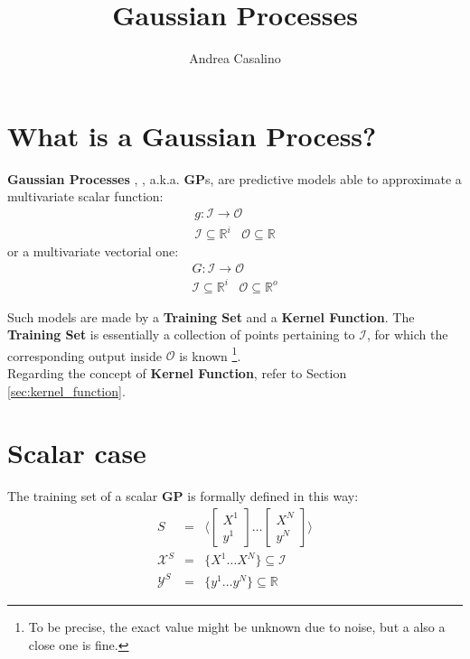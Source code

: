 \documentclass{article}
\author{Andrea Casalino}
\title{Gaussian Processes}
\begin{document}
\maketitle

\newpage
\section{What is a Gaussian Process?}

\textbf{Gaussian Processes} \cite{GP_general_01}, \cite{GP_general_02}, a.k.a. \textbf{GP}s, are predictive models able to approximate a multivariate scalar function:
\begin{eqnarray}
g : \mathcal{I} \rightarrow \mathcal{O} \\
\mathcal{I} \subseteq \mathbb{R}^i \,\,\,\,\, \mathcal{O} \subseteq \mathbb{R}
\end{eqnarray}
or a  multivariate vectorial one:
\begin{eqnarray}
G : \mathcal{I} \rightarrow \mathcal{O} \\
\mathcal{I} \subseteq \mathbb{R}^i \,\,\,\,\, \mathcal{O} \subseteq \mathbb{R}^o 
\end{eqnarray}

Such models are made by a \textbf{Training Set} and a \textbf{Kernel Function}.
The \textbf{Training Set} is essentially a collection of points pertaining to $\mathcal{I}$, for which the corresponding output inside $\mathcal{O}$ is known \footnote{To be precise, the exact value might be unknown due to noise, but a also a close one is fine.}.
\\
Regarding the concept of \textbf{Kernel Function}, refer to Section \ref{sec:kernel_function}.

\section{Scalar case}

The training set of a scalar \textbf{GP} is formally defined in this way:
\begin{eqnarray}
S &=& 
\bigg \langle 
\begin{bmatrix} X^1 \\ y^1 \end{bmatrix}
\hdots
\begin{bmatrix} X^N \\ y^N \end{bmatrix} 
\bigg \rangle \\
\mathcal{X}^S &=& \big \lbrace X^1 \hdots X^N \big \rbrace \subseteq \mathcal{I} \\
\mathcal{Y}^S &=& \big \lbrace y^1 \hdots y^N \big \rbrace \subseteq \mathbb{R}
\end{eqnarray}
\end{document}
